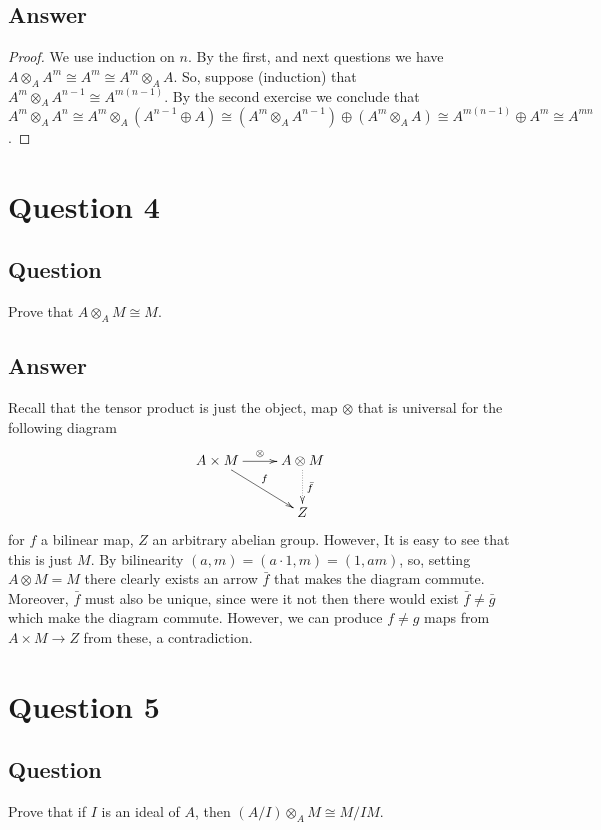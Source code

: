 \documentclass[11pt]{article}
\begin{document}
\subsection{Answer}
\begin{proof}
We use induction on $n$. By the first, and next questions we have $ A \otimes_A A^m \cong A^m \cong A^m \otimes_A A. $ So, suppose (induction) that $A^m \otimes_A A^{n-1} \cong A^{m(n-1)}$. By the second exercise we conclude that $A^m \otimes_A A^n \cong A^m \otimes_A (A^{n-1} \oplus A) \cong (A^m \otimes_A A^{n-1}) \oplus (A^m \otimes_A A) \cong A^{m(n-1)}\oplus A^m \cong A^{mn}$.
\end{proof}


\section{Question 4}
\subsection{Question}
Prove that $A \otimes_A M \cong M$.
\subsection{Answer}
Recall that the tensor product is just the object, map $\otimes$ that is universal for the following diagram
\[
\xymatrix{
A \times M \ar[r]^\otimes \ar[dr]^f & A \otimes M  \ar@{.>}[d]^{\bar{f}} \\
  & Z  \\
}
\]
for $f$ a bilinear map, $Z$ an arbitrary abelian group. However, It is easy to see that this is just $M$. By bilinearity $(a, m) = (a \cdot 1 , m ) = (1, am)$, so, setting $A \otimes M = M$ there clearly exists an arrow $\bar{f}$ that makes the diagram commute. Moreover, $\bar{f}$ must also be unique, since were it not then there would exist $\bar{f} \neq \bar{g}$ which make the diagram commute. However, we can produce $f \neq g$ maps from $A \times M \to Z$ from these, a contradiction.

\section{Question 5}
\subsection{Question}
Prove that if $I$ is an ideal of $A$, then $(A/I) \otimes_A M \cong M/IM$.
\end{document}

